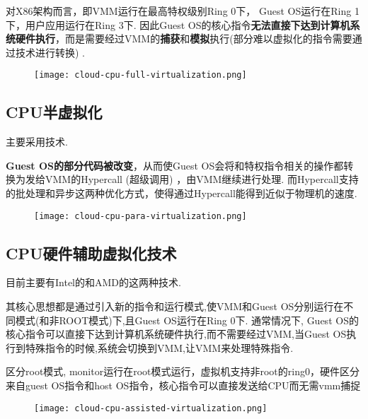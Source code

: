 对X86架构而言，即VMM运行在最高特权级别Ring 0下， Guest OS运行在Ring 1下，用户应用运行在Ring 3下. 因此Guest OS的核心指令\textbf{无法直接下达到计算机系统硬件执行}，而是需要经过VMM的\textbf{捕获}和\textbf{模拟}执行(部分难以虚拟化的指令需要通过技术进行转换) . 

\begin{figure}[htbp]
    \begin{center}
        \texttt{[image: cloud-cpu-full-virtualization.png]}
    \end{center}
\end{figure}

\subsection{CPU半虚拟化}
    
主要采用技术. 

\textbf{Guest OS的部分代码被改变}，从而使Guest OS会将和特权指令相关的操作都转换为发给VMM的Hypercall (超级调用) ，由VMM继续进行处理. 而Hypercall支持的批处理和异步这两种优化方式，使得通过Hypercall能得到近似于物理机的速度. 

\begin{figure}[htbp]
    \begin{center}
        \texttt{[image: cloud-cpu-para-virtualization.png]}
    \end{center}
\end{figure}

\subsection{CPU硬件辅助虚拟化技术}

目前主要有Intel的和AMD的这两种技术. 

其核心思想都是通过引入新的指令和运行模式,使VMM和Guest OS分别运行在不同模式(和非ROOT模式)下,且Guest OS运行在Ring 0下. 通常情况下, Guest OS的核心指令可以直接下达到计算机系统硬件执行,而不需要经过VMM,当Guest OS执行到特殊指令的时候,系统会切换到VMM,让VMM来处理特殊指令. 

区分root模式, monitor运行在root模式运行，虚拟机支持非root的ring0，硬件区分来自guest OS指令和host OS指令，核心指令可以直接发送给CPU而无需vmm捕捉

\begin{figure}[htbp]
    \begin{center}
        \texttt{[image: cloud-cpu-assisted-virtualization.png]}
    \end{center}
\end{figure}

